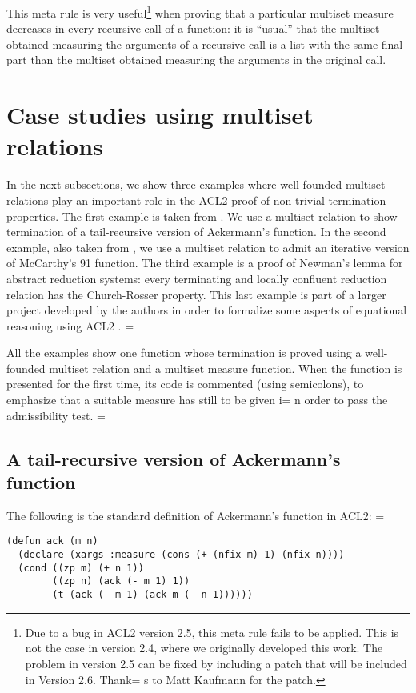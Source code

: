 \documentclass[11pt]{llncs}
\begin{document}
{\begin{itemize}
This meta rule is very useful\footnote{Due to a bug in ACL2 version 2.5,
this meta rule fails to be applied. This is not the case in version 2.4,
where we originally developed  this work. The problem in version 2.5 can
be fixed by including a patch that will be included in Version 2.6. Thank=
s
to Matt Kaufmann for the patch.} when proving that a particular multiset
measure decreases in every recursive call of a function: it is ``usual''
that the multiset obtained measuring the arguments of a recursive call
is a list with the same final part than the multiset obtained measuring
the arguments in the original call.

\end{itemize}

\section{Case studies using multiset relations}

In the next subsections, we show three examples where well-founded
multiset relations play an important role in the ACL2 proof of
non-trivial termination properties. The first example is taken from
\cite{DM-multiset}. We use a multiset relation to show termination of a
tail-recursive version of Ackermann's function. In the second example,
also taken from \cite{DM-multiset}, we use a multiset relation to admit
an iterative version of McCarthy's 91 function. The third example is a
proof of Newman's lemma for abstract reduction systems: every
terminating and locally confluent reduction relation has the
Church-Rosser property. This last example is part of a larger project
developed by the authors in order to formalize some aspects of
equational reasoning using ACL2 \cite{RRweb,RR2}. =


All the examples show one function whose termination is proved using a
well-founded multiset relation and a multiset measure function. When the
function is presented for the first time, its code is commented (using
semicolons), to emphasize that a suitable measure has still to be given i=
n
order to pass the admissibility test.  =


\subsection{A tail-recursive version of Ackermann's function}
The following is the standard definition of Ackermann's function in
ACL2: =


\begin{verbatim}
(defun ack (m n)
  (declare (xargs :measure (cons (+ (nfix m) 1) (nfix n))))
  (cond ((zp m) (+ n 1))
        ((zp n) (ack (- m 1) 1))
        (t (ack (- m 1) (ack m (- n 1))))))
\end{verbatim}

}
\end{document}
